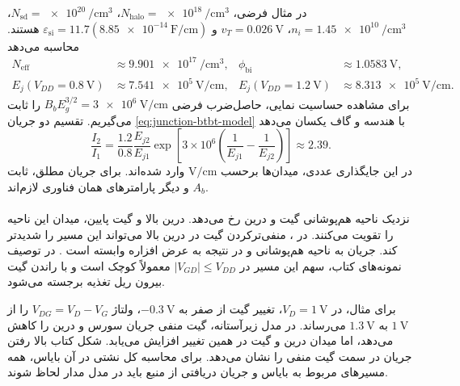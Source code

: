 در مثال فرضی، \(N_{\mathrm{halo}}=\qty{e18}{\per\centi\metre\cubed}\)،
\(N_{\mathrm{sd}}=\qty{e20}{\per\centi\metre\cubed}\)،
\(n_i=\qty{1.45e10}{\per\centi\metre\cubed}\)،
\(v_T=\qty{0.026}{\volt}\) و
\(\varepsilon_{\mathrm{si}}=11.7(\qty{8.85e-14}{\farad\per\centi\metre})\)
هستند. محاسبه می‌دهد
\begin{align*}
 N_{\mathrm{eff}}&\approx\qty{9.901e17}{\per\centi\metre\cubed},
 &\phi_{\mathrm{bi}}&\approx\qty{1.0583}{\volt},\\
 E_j(V_{DD}=\qty{0.8}{\volt})&\approx\qty{7.541e5}{\volt\per\centi\metre},
 &E_j(V_{DD}=\qty{1.2}{\volt})&\approx\qty{8.313e5}{\volt\per\centi\metre}.
\end{align*}
برای مشاهده حساسیت نمایی، حاصل‌ضرب فرضی
\(B_bE_g^{3/2}=\qty{3e6}{\volt\per\centi\metre}\) را ثابت می‌گیریم.
تقسیم دو جریان \eqref{eq:junction-btbt-model} با هندسه و گاف یکسان
می‌دهد
\begin{equation*}
 \frac{I_2}{I_1}=
 \frac{1.2}{0.8}\frac{E_{j2}}{E_{j1}}
 \exp\!\left[3\times10^6
 \left(\frac{1}{E_{j1}}-\frac{1}{E_{j2}}\right)\right]
 \approx2.39.
\end{equation*}
در این جایگذاری عددی، میدان‌ها برحسب
\(\unit{\volt\per\centi\metre}\) وارد شده‌اند.
برای جریان مطلق، ثابت \(A_b\) و دیگر پارامترهای همان فناوری لازم‌اند.

\paragraph*{}
 نزدیک ناحیه هم‌پوشانی گیت و
درین رخ می‌دهد. درین بالا و گیت پایین، میدان این ناحیه را تقویت
می‌کنند. در ، منفی‌ترکردن گیت در درین بالا می‌تواند این
مسیر را شدیدتر کند. جریان به ناحیه هم‌پوشانی و در نتیجه به عرض
افزاره وابسته است \cite[صفحات ۸۴ و ابتدای ۸۵]{weste}
\cite[اسلاید ۲۸]{nonideal}.
در توصیف نمونه‌های کتاب، سهم این مسیر در
\(|V_{GD}|\le V_{DD}\) معمولاً کوچک است و با راندن گیت بیرون ریل
تغذیه برجسته می‌شود.

برای مثال، در \(V_D=\qty{1}{\volt}\)، تغییر گیت از صفر به
\(-\qty{0.3}{\volt}\)، ولتاژ \(V_{DG}=V_D-V_G\) را از
\(\qty{1}{\volt}\) به \(\qty{1.3}{\volt}\) می‌رساند.
در مدل زیرآستانه، گیت منفی جریان سورس و درین را کاهش می‌دهد، اما
میدان درین و گیت در همین تغییر افزایش می‌یابد.
شکل  کتاب بالا رفتن جریان در سمت گیت منفی را نشان
می‌دهد. برای محاسبه کل نشتی در آن بایاس، همه مسیرهای مربوط به
بایاس و جریان دریافتی از منبع باید در مدل مدار لحاظ شوند.
